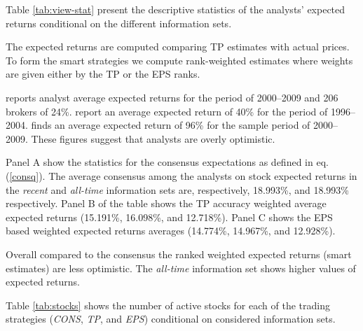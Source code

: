 \documentclass{article}\usepackage[]{graphicx}\usepackage[]{color}
\newcommand{\naive}{\textit{recent}}
\newcommand{\default}{\textit{all-time}}
\begin{document}
Table \ref{tab:view-stat} present the descriptive statistics of the analysts' expected returns conditional on the different information sets. 


The expected returns  are computed comparing TP estimates with actual prices. To form the smart strategies we compute rank-weighted estimates where weights are given either by the TP or the EPS ranks. 

\cite{bradshaw2002} reports analyst average expected returns for the period of 2000--2009 and 206 brokers of 24\%. \cite{da2011} report an average expected return of 40\% for the period of 1996--2004. \cite{zhou2013} finds an average expected return of 96\% for the sample period of 2000--2009. These figures suggest that analysts are overly optimistic.

Panel A show the statistics for the consensus expectations as defined in eq. (\ref{consq}). The average consensus among the analysts on stock expected returns in the  \naive{} and \default{} information sets are, respectively, 18.993\%, and 18.993\% respectively. Panel B of the table shows the TP accuracy weighted average expected returns (15.191\%, 16.098\%, and 12.718\%). Panel C shows the EPS based weighted expected returns averages (14.774\%, 14.967\%, and 12.928\%). 

Overall compared to the consensus the ranked weighted expected returns (smart estimates) are less optimistic. The \default{} information set shows higher values of expected returns.

Table \ref{tab:stocks} shows the number of active stocks for each of the trading strategies (\textit{CONS}, \textit{TP}, and \textit{EPS}) conditional on considered information sets.
\end{document}
